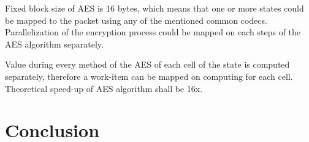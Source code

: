 Fixed block size of AES is 16 bytes, which means that one or more states could
be mapped to the packet using any of the mentioned common codecs. Parallelization
of the encryption process could be mapped on each steps of the AES algorithm
separately.

Value during every method of the AES of each cell of the state is computed 
separately, therefore a work-item can be mapped on computing for each cell. 
Theoretical speed-up of AES algorithm shall be 16x.

 












\chapter{Conclusion}\label{chapter:conclusion}


